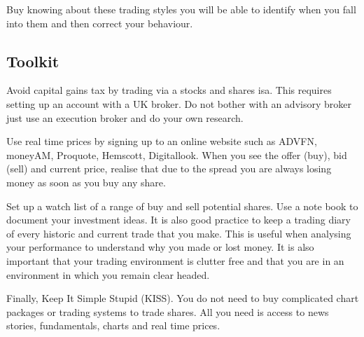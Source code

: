 Buy knowing about these trading styles you will be able to identify when you fall into them and then correct your behaviour.

\subsection*{Toolkit}
Avoid capital gains tax by trading via a stocks and shares isa. This requires setting up an account with a UK broker.
Do not bother with an advisory broker just use an execution broker and do your own research.

Use real time prices by signing up to an online website such as ADVFN, moneyAM, Proquote, Hemscott, Digitallook.
When you see the offer (buy), bid (sell) and current price, realise that due to the spread you are always losing money as soon as you buy any share.

Set up a watch list of a range of buy and sell potential shares.
Use a note book to document your investment ideas. 
It is also good practice to keep a trading diary of every historic and current trade that you make.
This is useful when analysing your performance to understand why you made or lost money.
It is also important that your trading environment is clutter free and that you are in an environment in which you remain clear headed.

Finally, Keep It Simple Stupid (KISS). 
You do not need to buy complicated chart packages or trading systems to trade shares.
All you need is access to news stories, fundamentals, charts and real time prices.

